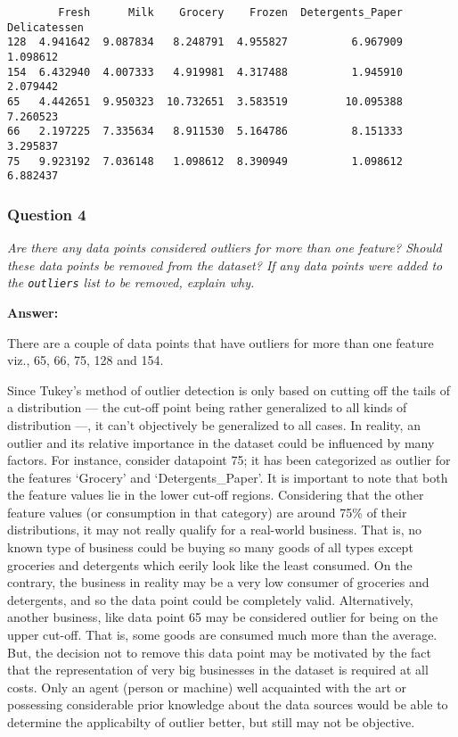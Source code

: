 \documentclass{article}
\begin{document}
    
    \begin{verbatim}
        Fresh      Milk    Grocery    Frozen  Detergents_Paper  Delicatessen
128  4.941642  9.087834   8.248791  4.955827          6.967909      1.098612
154  6.432940  4.007333   4.919981  4.317488          1.945910      2.079442
65   4.442651  9.950323  10.732651  3.583519         10.095388      7.260523
66   2.197225  7.335634   8.911530  5.164786          8.151333      3.295837
75   9.923192  7.036148   1.098612  8.390949          1.098612      6.882437
    \end{verbatim}

    
    \subsubsection{Question 4}\label{question-4}

\emph{Are there any data points considered outliers for more than one
feature? Should these data points be removed from the dataset? If any
data points were added to the \texttt{outliers} list to be removed,
explain why.}

    \textbf{Answer:}

There are a couple of data points that have outliers for more than one
feature viz., 65, 66, 75, 128 and 154.

Since Tukey's method of outlier detection is only based on cutting off
the tails of a distribution --- the cut-off point being rather
generalized to all kinds of distribution ---, it can't objectively be
generalized to all cases. In reality, an outlier and its relative
importance in the dataset could be influenced by many factors. For
instance, consider datapoint 75; it has been categorized as outlier for
the features `Grocery' and `Detergents\_Paper'. It is important to note
that both the feature values lie in the lower cut-off regions.
Considering that the other feature values (or consumption in that
category) are around 75\% of their distributions, it may not really
qualify for a real-world business. That is, no known type of business
could be buying so many goods of all types except groceries and
detergents which eerily look like the least consumed. On the contrary,
the business in reality may be a very low consumer of groceries and
detergents, and so the data point could be completely valid.
Alternatively, another business, like data point 65 may be considered
outlier for being on the upper cut-off. That is, some goods are consumed
much more than the average. But, the decision not to remove this data
point may be motivated by the fact that the representation of very big
businesses in the dataset is required at all costs. Only an agent
(person or machine) well acquainted with the art or possessing
considerable prior knowledge about the data sources would be able to
determine the applicabilty of outlier better, but still may not be
objective.
\end{document}
